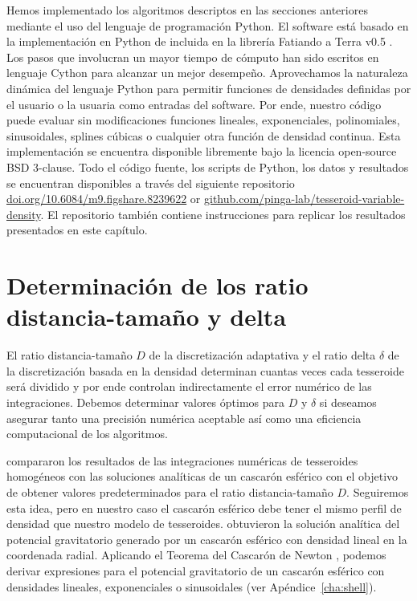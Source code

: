Hemos implementado los algoritmos descriptos en las secciones anteriores
mediante el uso del lenguaje de programación Python.
El software está basado en la implementación en Python de \citet{uieda2016}
incluida en la librería Fatiando a Terra v0.5 \citep{uieda2013}.
Los pasos que involucran un mayor tiempo de cómputo han sido escritos en
lenguaje Cython para alcanzar un mejor desempeño.
Aprovechamos la naturaleza dinámica del lenguaje Python para permitir funciones
de densidades definidas por el usuario o la usuaria como entradas del software.
Por ende, nuestro código puede evaluar sin modificaciones funciones lineales,
exponenciales, polinomiales, sinusoidales, splines cúbicas o cualquier otra
función de densidad continua.
Esta implementación se encuentra disponible libremente bajo la licencia
open-source BSD 3-clause.
Todo el código fuente, los scripts de Python, los datos y resultados se
encuentran disponibles a través del siguiente repositorio
\href{https://doi.org/10.6084/m9.figshare.8239622}{doi.org/10.6084/m9.figshare.8239622}
\citep{soler2019b} or
\href{https://github.com/pinga-lab/tesseroid-variable-density}{github.com/pinga-lab/tesseroid-variable-density}.
El repositorio también contiene instrucciones para replicar los resultados
presentados en este capítulo.



\section{Determinación de los ratio distancia-tamaño y delta}

El ratio distancia-tamaño $D$ de la discretización adaptativa y el ratio delta
$\delta$ de la discretización basada en la densidad determinan cuantas veces
cada tesseroide será dividido y por ende controlan indirectamente el error
numérico de las integraciones.
Debemos determinar valores óptimos para $D$ y $\delta$ si deseamos asegurar
tanto una precisión numérica aceptable así como una eficiencia computacional de
los algoritmos.

\citet{uieda2016} compararon los resultados de las integraciones numéricas de
tesseroides homogéneos con las soluciones analíticas de un cascarón esférico
\citep{mikuska2006, grombein2013} con el objetivo de obtener valores
predeterminados para el ratio distancia-tamaño $D$.
Seguiremos esta idea, pero en nuestro caso el cascarón esférico debe tener el
mismo perfil de densidad que nuestro modelo de tesseroides. \citet{lin2019}
obtuvieron la solución analítica del potencial gravitatorio generado por un
cascarón esférico con densidad lineal en la coordenada radial.
Aplicando el Teorema del Cascarón de Newton \citep{chandrasekhar1995,
binney2008}, podemos derivar expresiones para el potencial gravitatorio de un
cascarón esférico con densidades lineales, exponenciales o sinusoidales (ver
Apéndice~\ref{cha:shell}).

